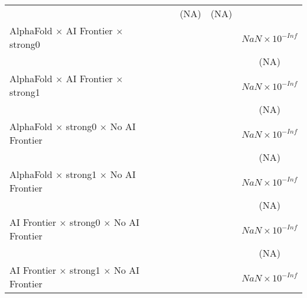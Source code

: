 \begin{tabular}{lcccccc}
                                                                              &               &        &        & (NA)                   & (NA)                   &   \\   
   AlphaFold $\times$ AI Frontier $\times$ strong0                            &               &        &        &                        &                        & $NaN\times 10^{-Inf}$\\    
                                                                              &               &        &        &                        &                        & (NA)\\   
   AlphaFold $\times$ AI Frontier $\times$ strong1                            &               &        &        &                        &                        & $NaN\times 10^{-Inf}$\\    
                                                                              &               &        &        &                        &                        & (NA)\\   
   AlphaFold $\times$ strong0 $\times$ No AI Frontier                         &               &        &        &                        &                        & $NaN\times 10^{-Inf}$\\    
                                                                              &               &        &        &                        &                        & (NA)\\   
   AlphaFold $\times$ strong1 $\times$ No AI Frontier                         &               &        &        &                        &                        & $NaN\times 10^{-Inf}$\\    
                                                                              &               &        &        &                        &                        & (NA)\\   
   AI Frontier $\times$ strong0 $\times$ No AI Frontier                       &               &        &        &                        &                        & $NaN\times 10^{-Inf}$\\    
                                                                              &               &        &        &                        &                        & (NA)\\   
   AI Frontier $\times$ strong1 $\times$ No AI Frontier                       &               &        &        &                        &                        & $NaN\times 10^{-Inf}$\\    

\end{tabular}
